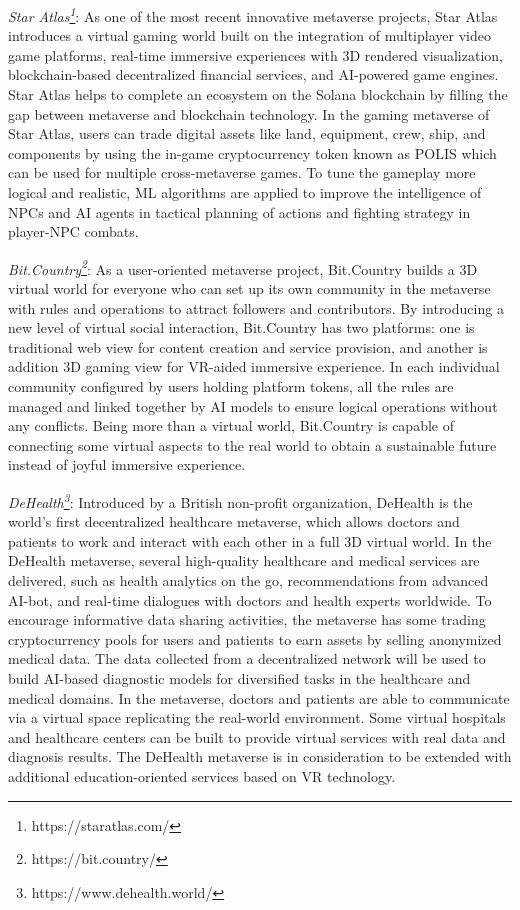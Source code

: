 \documentclass[journal]{IEEEtran}
\begin{document}
\textit{Star Atlas\footnote{https://staratlas.com/}}:
As one of the most recent innovative metaverse projects, Star Atlas introduces a virtual gaming world built on the integration of multiplayer video game platforms, real-time immersive experiences with 3D rendered visualization, blockchain-based decentralized financial services, and AI-powered game engines. Star Atlas helps to complete an ecosystem on the Solana blockchain by filling the gap between metaverse and blockchain technology.
In the gaming metaverse of Star Atlas, users can trade digital assets like land, equipment, crew, ship, and components by using the in-game cryptocurrency token known as POLIS which can be used for multiple cross-metaverse games. 
To tune the gameplay more logical and realistic, ML algorithms are applied to improve the intelligence of NPCs and AI agents in tactical planning of actions and fighting strategy in player-NPC combats.

\textit{Bit.Country\footnote{https://bit.country/}}:
As a user-oriented metaverse project, Bit.Country builds a 3D virtual world for everyone who can set up its own community in the metaverse with rules and operations to attract followers and contributors. 
By introducing a new level of virtual social interaction, Bit.Country has two platforms: one is traditional web view for content creation and service provision, and another is addition 3D gaming view for VR-aided immersive experience. 
In each individual community configured by users holding platform tokens, all the rules are managed and linked together by AI models to ensure logical operations without any conflicts. 
Being more than a virtual world, Bit.Country is capable of connecting some virtual aspects to the real world to obtain a sustainable future instead of joyful immersive experience.

\textit{DeHealth\footnote{https://www.dehealth.world/}}:
 Introduced by a British non-profit organization, DeHealth is the world’s first decentralized healthcare metaverse, which allows doctors and patients to work and interact with each other in a full 3D virtual world. In the DeHealth metaverse, several high-quality healthcare and medical services are delivered, such as health analytics on the go, recommendations from advanced AI-bot, and real-time dialogues with doctors and health experts worldwide. To encourage informative data sharing activities, the metaverse has some trading cryptocurrency pools for users and patients to earn assets by selling anonymized medical data. The data collected from a decentralized network will be used to build AI-based diagnostic models for diversified tasks in the healthcare and medical domains. In the metaverse, doctors and patients are able to communicate via a virtual space replicating the real-world environment. Some virtual hospitals and healthcare centers can be built to provide virtual services with real data and diagnosis results. The DeHealth metaverse is in consideration to be extended with additional education-oriented services based on VR technology.
\end{document}
